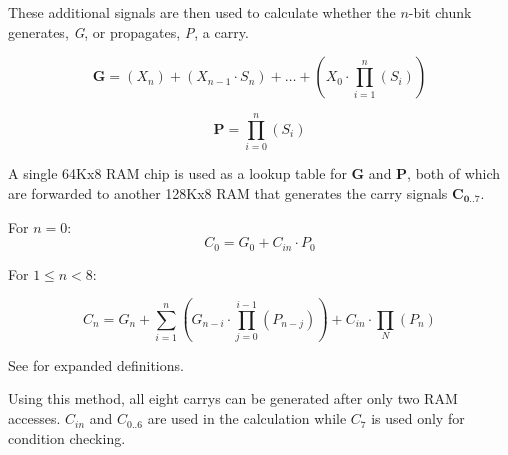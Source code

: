 \documentclass[a4paper, 11pt]{article}
\begin{document}
                These additional signals are then used to calculate whether the \(n\)-bit
                chunk generates, \emph{G}, or propagates, \emph{P}, a carry.

                \begin{equation}\label{eq:ALU:Adder:ModCLA:G}
                    \mathbf{G}  =   (X_n) +
                                    (X_{n-1} \cdot S_{n}) +
                                    \dots +
                                    \left( X_0 \cdot \prod_{i=1}^{n}(S_i) \right)
                \end{equation}

                \begin{equation}\label{eq:ALU:Adder:ModCLA:P}
                    \mathbf{P}  =   \prod_{i=0}^{n}(S_i)
                \end{equation}

                A single 64Kx8 RAM chip is used as a lookup table for 
                \textbf{G} and \textbf{P}, both of which are forwarded to 
                another 128Kx8 RAM that generates the carry signals 
                \(\mathbf{C_{0..7}}\).

                For \(n=0\):
                \begin{equation}\label{eq:ALU:Adder:ModCLA:C0}
                    C_0 = G_0 + C_{in} \cdot P_0
                \end{equation}

                For \(1 \le n < 8\):

                \begin{equation}\label{eq:ALU:Adder:ModCLA:Cn}
                    C_n =   G_n +
                            \sum_{i=1}^{n}\left(G_{n-i} \cdot \prod_{j=0}^{i-1}\left(P_{n-j}\right)\right) +
                            C_{in}\cdot \prod_{N}\left(P_n\right)
                \end{equation}

                See  for expanded definitions.

                Using this method, all eight carrys can be generated after only 
                two RAM accesses. 
                \(C_{in}\) and \(C_{0..6}\) are used in the calculation while
                \(C_{7}\) is used only for condition checking.
\end{document}
